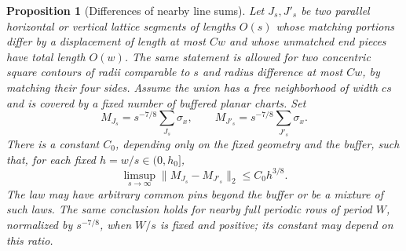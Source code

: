 \documentclass[11pt]{article}
\newtheorem{proposition}[theorem]{Proposition}
\theoremstyle{definition}
\theoremstyle{remark}
\numberwithin{equation}{section}
\begin{document}
\begin{proposition}[Differences of nearby line sums]
\label{tr:line-difference}
Let $J_s,J'_s$ be two parallel horizontal or vertical lattice segments of lengths $O(s)$ whose
matching portions differ by a displacement of length at most $Cw$ and
whose unmatched end pieces have total length $O(w)$. The same statement
is allowed for two concentric square contours of radii comparable to
$s$ and radius difference at most $Cw$, by matching their four sides.
Assume the union has a free neighborhood of width $cs$ and is covered
by a fixed number of buffered planar charts. Set
\[
 M_{J_s}=s^{-7/8}\sum_{J_s}\sigma_x,
 \qquad M_{J'_s}=s^{-7/8}\sum_{J'_s}\sigma_x.
\]
There is a constant $C_0$, depending only on the fixed geometry and the
buffer, such that, for each fixed $h=w/s\in(0,h_0]$,
\begin{equation}
\label{tr:line-difference-eq}
 \limsup_{s\to\infty}
       \|M_{J_s}-M_{J'_s}\|_2\leq C_0 h^{3/8}.
\end{equation}
The law may have arbitrary common pins beyond the buffer or be a mixture
of such laws. The same conclusion holds for nearby full periodic rows of period $W$,
normalized by $s^{-7/8}$, when $W/s$ is fixed and positive; its constant
may depend on this ratio.
\end{proposition}
\end{document}
